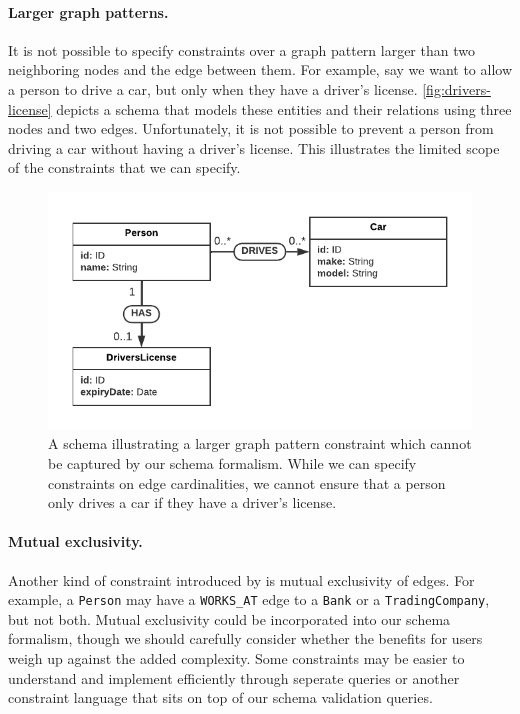 \documentclass{report}
\theoremstyle{definition}
\begin{document}
\paragraph{Larger graph patterns.} It is not possible to specify constraints over a graph pattern larger than two neighboring nodes and the edge between them. For example, say we want to allow a person to drive a car, but only when they have a driver's license. \autoref{fig:drivers-license} depicts a schema that models these entities and their relations using three nodes and two edges. Unfortunately, it is not possible to prevent a person from driving a car without having a driver's license. This illustrates the limited scope of the constraints that we can specify.

\begin{figure}[t]
  \centering
  \includegraphics{figures/drivers-license.pdf}
  \caption[A schema illustrating a larger graph pattern constraint which cannot be captured by our schema formalism]{A schema illustrating a larger graph pattern constraint which cannot be captured by our schema formalism. While we can specify constraints on edge cardinalities, we cannot ensure that a person only drives a car if they have a driver's license.}
  \label{fig:drivers-license}
\end{figure}

\paragraph{Mutual exclusivity.} Another kind of constraint introduced by \citet{barker1990entity} is mutual exclusivity of edges. For example, a \texttt{Person} may have a \texttt{WORKS\_AT} edge to a \texttt{Bank} or a \texttt{TradingCompany}, but not both. Mutual exclusivity could be incorporated into our schema formalism, though we should carefully consider whether the benefits for users weigh up against the added complexity. Some constraints may be easier to understand and implement efficiently through seperate queries or another constraint language that sits on top of our schema validation queries.
\end{document}
